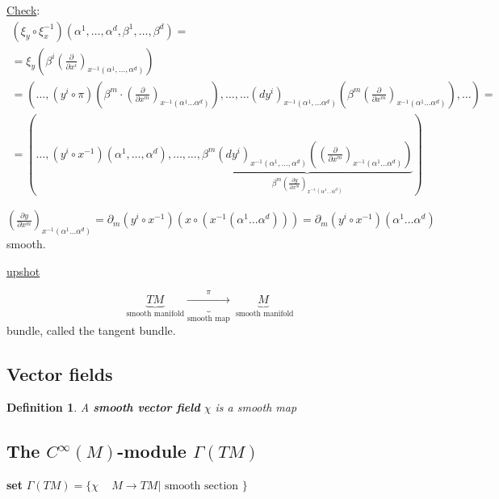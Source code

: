 \documentclass[10pt, twoside]{amsart}
\newtheorem{definition}{Definition}
\begin{document}
\begin{multicols*}{2}
\begin{enumerate}
\underline{Check}: \[
\begin{gathered}
  (\xi_y \circ \xi_x^{-1})(\alpha^1 , \dots , \alpha^d, \beta^1, \dots , \beta^d) = \\
  = \xi_y \left( \beta^i \left( \frac{ \partial }{ \partial x^i} \right)_{x^{-1}(\alpha^1 , \dots , \alpha^d) } \right) \\
  = \left( \dots, (y^i \circ \pi)( \beta^m \cdot \left( \frac{ \partial }{ \partial x^m} \right)_{x^{-1}(\alpha^1 \dots \alpha^d) } )  , \dots , \dots (dy^i)_{x^{-1}(\alpha^1, \dots \alpha^d) } \left( \beta^m \left( \frac{ \partial }{ \partial x^m} \right)_{x^{-1}(\alpha^1 \dots \alpha^d) } \right) , \dots   \right) = \\
  = ( \dots , (y^i \circ x^{-1})(\alpha^1 , \dots , \alpha^d), \dots , \dots , \underbrace{ \beta^m(dy^i)_{x^{-1} (\alpha^1, \dots , \alpha^d) } \left( \left( \frac{ \partial }{ \partial x^m} \right)_{x^{-1}(\alpha^1 \dots \alpha^d) } \right)}_{ \beta^m \left( \frac{ \partial y }{ \partial x^m } \right)_{x^{-1}(\alpha^1 \dots \alpha^d)} }  ) 
\end{gathered}
\]

%
$\left( \frac{ \partial y }{ \partial x^m } \right)_{x^{-1}(\alpha^1 \dots \alpha^d)} = \partial_m (y^i \circ x^{-1} )( x\circ (x^{-1}(\alpha^1 \dots \alpha^d) ) ) = \partial_m (y^i \circ x^{-1} )( \alpha^1 \dots \alpha^d)$ smooth.  

\underline{upshot}

\[
\underbrace{TM}_{\text{smooth manifold}} \underbrace{ \xrightarrow{\pi} }_{\text{smooth map} } \underbrace{M}_{\text{ smooth manifold} }
\]
bundle, called the tangent bundle.

\end{enumerate}

\subsection{Vector fields}

\begin{definition}
  A \textbf{smooth vector field} $\chi$ is a \emph{smooth} map
\end{definition}

\subsection{The $C^{\infty}(M)$-module $\Gamma(TM)$}

\textbf{set} $\Gamma(TM) = \lbrace \chi \quad \, M \to TM | \text{ smooth section } \rbrace$
 

\end{multicols*}
\end{document}

